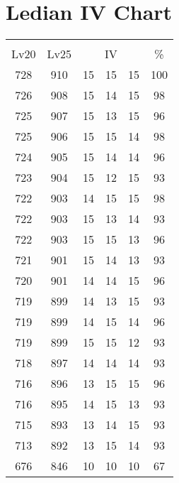 \documentclass{article}%
\begin{document}
%
\normalsize%
\section{Ledian IV Chart}%
\label{sec:Ledian IV Chart}%
\renewcommand{\arraystretch}{1.5}%
\begin{tabular}{|c|c|c|c|c|c|}%
\hline%
\multicolumn{6}{|c|}{\textcolor{white}{ 
\linebreak{Ledian}
}%
\cellcolor{black}}\\%
\multicolumn{1}{|c}{Lv20}&\multicolumn{1}{c|}{Lv25}&\multicolumn{3}{c|}{IV}&\multicolumn{1}{|c|}{\%}\\%
\hline%
\rowcolor{color100}%
728&910&15&15&15&100\\%
\hline%
\rowcolor{color98}%
726&908&15&14&15&98\\%
\hline%
\rowcolor{color96}%
725&907&15&13&15&96\\%
\hline%
\rowcolor{color98}%
725&906&15&15&14&98\\%
\hline%
\rowcolor{color96}%
724&905&15&14&14&96\\%
\hline%
\rowcolor{color93}%
723&904&15&12&15&93\\%
\hline%
\rowcolor{color98}%
722&903&14&15&15&98\\%
\hline%
\rowcolor{color93}%
722&903&15&13&14&93\\%
\hline%
\rowcolor{color96}%
722&903&15&15&13&96\\%
\hline%
\rowcolor{color93}%
721&901&15&14&13&93\\%
\hline%
\rowcolor{color96}%
720&901&14&14&15&96\\%
\hline%
\rowcolor{color93}%
719&899&14&13&15&93\\%
\hline%
\rowcolor{color96}%
719&899&14&15&14&96\\%
\hline%
\rowcolor{color93}%
719&899&15&15&12&93\\%
\hline%
\rowcolor{color93}%
718&897&14&14&14&93\\%
\hline%
\rowcolor{color96}%
716&896&13&15&15&96\\%
\hline%
\rowcolor{color93}%
716&895&14&15&13&93\\%
\hline%
\rowcolor{color93}%
715&893&13&14&15&93\\%
\hline%
\rowcolor{color93}%
713&892&13&15&14&93\\%
\hline%
\rowcolor{color91}%
676&846&10&10&10&67\\%
\end{tabular}

%
\end{document}
